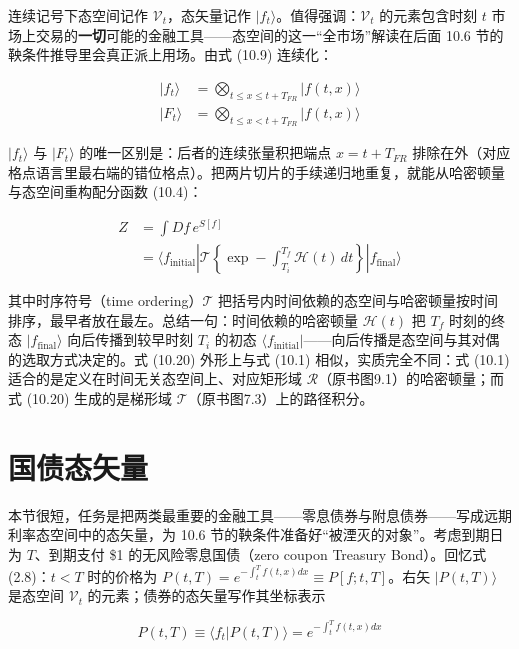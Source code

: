 连续记号下态空间记作 $\mathcal{V}_t$，态矢量记作 $|f_t\rangle$。值得强调：$\mathcal{V}_t$ 的元素包含时刻 $t$ 市场上交易的\textbf{一切}可能的金融工具——态空间的这一“全市场”解读在后面 10.6 节的鞅条件推导里会真正派上用场。由式 (10.9) 连续化：

\begin{equation*}
\begin{aligned}
|f_t\rangle&=\bigotimes_{t\le x\le t+T_{FR}}|f(t,x)\rangle\\
|F_t\rangle&=\bigotimes_{t\le x< t+T_{FR}}|f(t,x)\rangle
\end{aligned}
\tag{10.19}
\end{equation*}

$|f_t\rangle$ 与 $|F_t\rangle$ 的唯一区别是：后者的连续张量积把端点 $x=t+T_{FR}$ 排除在外（对应格点语言里最右端的错位格点）。把两片切片的手续递归地重复，就能从哈密顿量与态空间重构配分函数 (10.4)：

\begin{equation*}
\begin{aligned}
Z&=\int Df\,e^{S[f]}\\
&=\langle f_{\text{initial}}|\mathcal{T}\left\{\exp-\int_{T_i}^{T_f}\mathcal{H}(t)\,dt\right\}|f_{\text{final}}\rangle
\end{aligned}
\tag{10.20}
\end{equation*}

其中时序符号（time ordering）$\mathcal{T}$ 把括号内时间依赖的态空间与哈密顿量按时间排序，最早者放在最左。总结一句：时间依赖的哈密顿量 $\mathcal{H}(t)$ 把 $T_f$ 时刻的终态 $|f_{\text{final}}\rangle$ 向后传播到较早时刻 $T_i$ 的初态 $\langle f_{\text{initial}}|$——向后传播是态空间与其对偶的选取方式决定的。式 (10.20) 外形上与式 (10.1) 相似，实质完全不同：式 (10.1) 适合的是定义在时间无关态空间上、对应矩形域 $\mathcal{R}$（原书图9.1）的哈密顿量；而式 (10.20) 生成的是梯形域 $\mathcal{T}$（原书图7.3）上的路径积分。

\section{国债态矢量}

本节很短，任务是把两类最重要的金融工具——零息债券与附息债券——写成远期利率态空间中的态矢量，为 10.6 节的鞅条件准备好“被湮灭的对象”。考虑到期日为 $T$、到期支付 \$1 的无风险零息国债（zero coupon Treasury Bond）。回忆式 (2.8)：$t<T$ 时的价格为 $P(t,T)=e^{-\int_t^T f(t,x)dx}\equiv P[f;t,T]$。右矢 $|P(t,T)\rangle$ 是态空间 $\mathcal{V}_t$ 的元素；债券的态矢量写作其坐标表示

\begin{equation*}
P(t,T)\equiv\langle f_t|P(t,T)\rangle=e^{-\int_t^T f(t,x)dx}
\tag{10.21}
\end{equation*}

